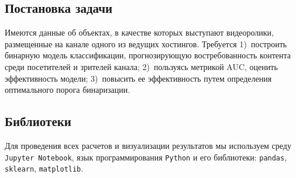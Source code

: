 \subsection{Постановка задачи}
Имеются данные об объектах, в качестве которых выступают видеоролики,  размещенные на канале одного из ведущих хостингов. Требуется 1)~построить бинарную модель классификации, прогнозирующую востребованность контента среди посетителей и зрителей канала; 2)~пользуясь метрикой AUC, оценить эффективность модели; 3)~повысить ее эффективность путем определения оптимального порога бинаризации.

\subsection{Библиотеки} 
Для проведения всех расчетов и визуализации результатов мы используем среду \texttt{Jupyter Notebook}, язык программирования \texttt{Python} и его библиотеки: \texttt{pandas}, \texttt{sklearn}, \texttt{matplotlib}. 